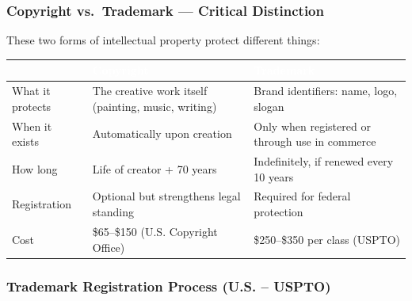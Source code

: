 \documentclass[11pt,letterpaper]{article}
\newcommand{\tableheader}[1]{\textbf{\sffamily\textcolor{white}{#1}}}
\begin{document}
\subsubsection{Copyright vs.\ Trademark --- Critical Distinction}

These two forms of intellectual property protect different things:

\begin{tabularx}{\textwidth}{L{3cm}XX}
\toprule
{}
\tableheader{} & \tableheader{Copyright} & \tableheader{Trademark} \\
\midrule
What it protects & The creative work itself (painting, music, writing) & Brand identifiers: name, logo, slogan \\
When it exists & Automatically upon creation & Only when registered or through use in commerce \\
How long & Life of creator + 70 years & Indefinitely, if renewed every 10 years \\
Registration & Optional but strengthens legal standing & Required for federal protection \\
Cost & \$65--\$150 (U.S. Copyright Office) & \$250--\$350 per class (USPTO) \\
\bottomrule
\end{tabularx}

\subsubsection{Trademark Registration Process (U.S. -- USPTO)}
\end{document}
